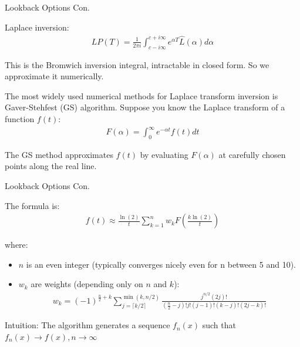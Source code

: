 \documentclass{beamer}
\begin{document}
\begin{frame}{Lookback Options Con.}


    {\footnotesize \footnotesize
    \par Laplace inversion: 
    \begin{align*}
        LP(T)  = \frac{1}{2\pi i} 
        \int_{c-i\infty}^{c+i\infty} e^{\alpha T} \hat{L}(\alpha)  d\alpha
    \end{align*}
    \par This is the Bromwich inversion integral, intractable in closed form.
     So we approximate it numerically. 
     \par  \pause The most widely used numerical methods for Laplace transform inversion is
     Gaver-Stehfest (GS) algorithm. Suppose you know the Laplace transform of a function \( f(t) \):
     \begin{align*}
        F(\alpha) = \int_{0}^{\infty} e^{-\alpha t} f(t)  dt
     \end{align*}
     \par The GS method approximates \( f(t) \) by evaluating \( F(\alpha) \) at carefully 
     chosen points along the real line.

    }
    
\end{frame}

\begin{frame}{Lookback Options Con.}


    {\footnotesize \footnotesize
    \par The formula is:
    \begin{align*}
        f(t) \approx \frac{\ln(2)}{t} \sum_{k=1}^{n} w_k F \left( \frac{k \ln(2)}{t} \right)
    \end{align*}

where:

\begin{itemize}
    \item \( n \) is an even integer (typically converges nicely even for n between 5 and 10).
    \item \( w_k \) are weights (depending only on \( n \) and \( k \)):
    \begin{align*}
        w_k = (-1)^{\frac{n}{2}+k} \sum_{j=\lceil k/2 \rceil}^{\min(k,n/2)} 
        \frac{j^{n/2}(2j)!}{(\frac{n}{2}-j)! j! (j-1)! (k-j)! (2j-k)!}
    \end{align*}
\end{itemize}
\par Intuition: The algorithm generates a sequence \( f_n(x) \) such that \( f_n(x) \to f(x),  n \to \infty \)

    }
\end{frame}
\end{document}
